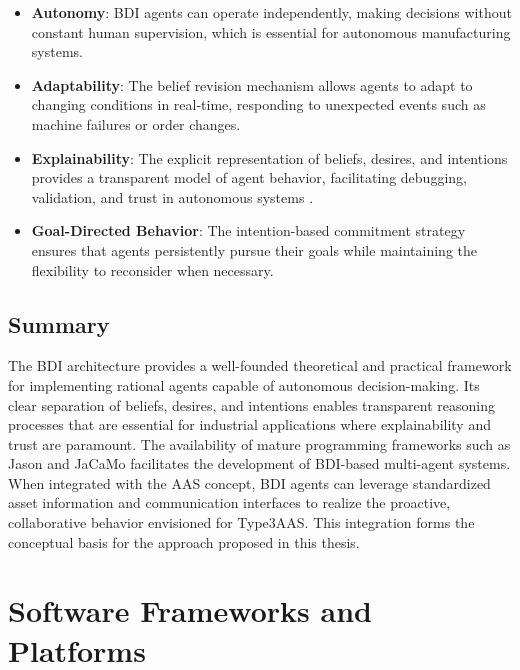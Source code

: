 \begin{itemize}
    \item \textbf{Autonomy}: \ac{BDI} agents can operate independently, making decisions without constant human supervision, which is essential for autonomous manufacturing systems.
    
    \item \textbf{Adaptability}: The belief revision mechanism allows agents to adapt to changing conditions in real-time, responding to unexpected events such as machine failures or order changes.
    
    \item \textbf{Explainability}: The explicit representation of beliefs, desires, and intentions provides a transparent model of agent behavior, facilitating debugging, validation, and trust in autonomous systems \cite{yan2025multi}.
    
    \item \textbf{Goal-Directed Behavior}: The intention-based commitment strategy ensures that agents persistently pursue their goals while maintaining the flexibility to reconsider when necessary.
\end{itemize}

\newpage

\subsection{Summary}

The \ac{BDI} architecture provides a well-founded theoretical and practical framework for implementing rational agents capable of autonomous decision-making. Its clear separation of beliefs, desires, and intentions enables transparent reasoning processes that are essential for industrial applications where explainability and trust are paramount. The availability of mature programming frameworks such as Jason and JaCaMo facilitates the development of \ac{BDI}-based multi-agent systems. When integrated with the \ac{AAS} concept, \ac{BDI} agents can leverage standardized asset information and communication interfaces to realize the proactive, collaborative behavior envisioned for \ac{Type3AAS}. This integration forms the conceptual basis for the approach proposed in this thesis.

\section{Software Frameworks and Platforms}
\label{sec:software frameworks and platforms}

